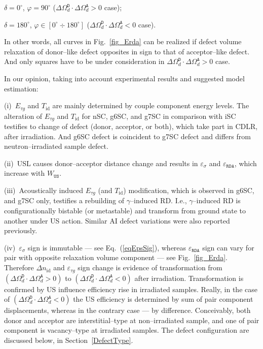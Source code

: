 \documentclass[aip,jap, amsmath,amssymb,reprint]{revtex4-1}
\begin{document}
\noindent  $\delta=0^\circ$, $\varphi=90^\circ$ ($\Delta\Omega_d^\mathtt{D}\cdot\Delta\Omega_d^\mathtt{A}>0$ case);

\noindent  $\delta=180^\circ$, $\varphi\in[0^\circ\div 180^\circ]$ ($\Delta\Omega_d^\mathtt{D}\cdot\Delta\Omega_d^\mathtt{A}<0$ case).

\noindent
In other words, all curves in Fig.~\ref{fig_Erda} can be realized if defect volume relaxation of donor--like defect opposites in sign to that of acceptor--like defect.
And only squares have to be under consideration in $\Delta\Omega_d^\mathtt{D}\cdot\Delta\Omega_d^\mathtt{A}>0$ case.

In our opinion, taking into account experimental results and suggested model estimation:

\noindent
(i)~$E_{\tau g}$ and $T_{\mathrm{id}}$ are mainly determined by couple component energy levels.
The alteration of $E_{\tau g}$ and $T_{\mathrm{id}}$ for nSC, g6SC, and g7SC in comparison with iSC testifies to change of defect (donor, acceptor, or both),
which take part in CDLR, after irradiation.
And g6SC defect is coincident to g7SC defect and differs from neutron--irradiated sample defect.

\noindent
(ii)~USL causes donor--acceptor distance change and results in $\varepsilon_{\sigma}$ and $\varepsilon_{\mathtt{RDA}}$,
which increase with $W_{\mathtt{US}}$.

\noindent
(iii)~Acoustically induced $E_{\tau g}$ (and $T_{\mathrm{id}}$) modification, which is observed in g6SC, and g7SC only,
testifies a rebuilding of  $\gamma$--induced RD.
I.e., $\gamma$--induced RD is conﬁgurationally bistable (or metastable) and transform from ground state to another under US action.
Similar AI defect variations were also reported previously.\cite{Wosinski,Ostapenko1994,Olikh2009Sem,YOlikhTPL2011}

\noindent
(iv)~$\varepsilon_{\sigma}$ sign is immutable --- see Eq.~(\ref{eqEpsSig}),
whereas $\varepsilon_{\mathtt{RDA}}$ sign can vary for pair with opposite relaxation volume component --- see Fig.~\ref{fig_Erda}.
Therefore $\Delta n_{\mathrm{id}}$ and $\varepsilon_{\tau g}$ sign change is evidence of transformation
from $(\Delta\Omega_d^\mathtt{D}\cdot\Delta\Omega_d^\mathtt{A}>0)$  to
$(\Delta\Omega_d^\mathtt{D}\cdot\Delta\Omega_d^\mathtt{A}<0)$  after irradiation.
Transformation is confirmed by US influence efficiency rise in irradiated samples.
Really, in the case of $(\Delta\Omega_d^\mathtt{D}\cdot\Delta\Omega_d^\mathtt{A}<0)$ the US efficiency is determined by sum of pair component displacements,
whereas in the contrary case  --- by difference.
Conceivably, both donor and acceptor are interstitial--type at non--irradiated sample, and one of pair component is vacancy--type at irradiated samples.
The defect configuration are discussed below, in Section~\ref{DefectType}.
\end{document}
